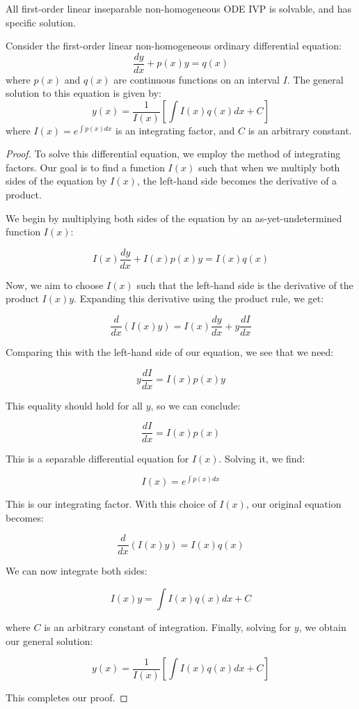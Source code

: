 \documentclass[12pt,a4paper]{article}
\begin{document}
\begin{remark}
All first-order linear inseparable non-homogeneous ODE IVP is solvable, and has specific solution. 

\begin{theorem}
Consider the first-order linear non-homogeneous ordinary differential equation:
\[
\frac{dy}{dx} + p(x)y = q(x)
\]
where $p(x)$ and $q(x)$ are continuous functions on an interval $I$. The general solution to this equation is given by:
\[
y(x) = \frac{1}{I(x)}\left[\int I(x)q(x)dx + C\right]
\]
where $I(x) = e^{\int p(x)dx}$ is an integrating factor, and $C$ is an arbitrary constant.
\end{theorem}

\begin{proof}
To solve this differential equation, we employ the method of integrating factors. Our goal is to find a function $I(x)$ such that when we multiply both sides of the equation by $I(x)$, the left-hand side becomes the derivative of a product.

We begin by multiplying both sides of the equation by an as-yet-undetermined function $I(x)$:

\[
I(x)\frac{dy}{dx} + I(x)p(x)y = I(x)q(x)
\]

Now, we aim to choose $I(x)$ such that the left-hand side is the derivative of the product $I(x)y$. Expanding this derivative using the product rule, we get:

\[
\frac{d}{dx}(I(x)y) = I(x)\frac{dy}{dx} + y\frac{dI}{dx}
\]

Comparing this with the left-hand side of our equation, we see that we need:

\[
y\frac{dI}{dx} = I(x)p(x)y
\]

This equality should hold for all $y$, so we can conclude:

\[
\frac{dI}{dx} = I(x)p(x)
\]

This is a separable differential equation for $I(x)$. Solving it, we find:

\[
I(x) = e^{\int p(x)dx}
\]

This is our integrating factor. With this choice of $I(x)$, our original equation becomes:

\[
\frac{d}{dx}(I(x)y) = I(x)q(x)
\]

We can now integrate both sides:

\[
I(x)y = \int I(x)q(x)dx + C
\]

where $C$ is an arbitrary constant of integration. Finally, solving for $y$, we obtain our general solution:

\[
y(x) = \frac{1}{I(x)}\left[\int I(x)q(x)dx + C\right]
\]

This completes our proof.
\end{proof}
\end{remark}
\end{document}
